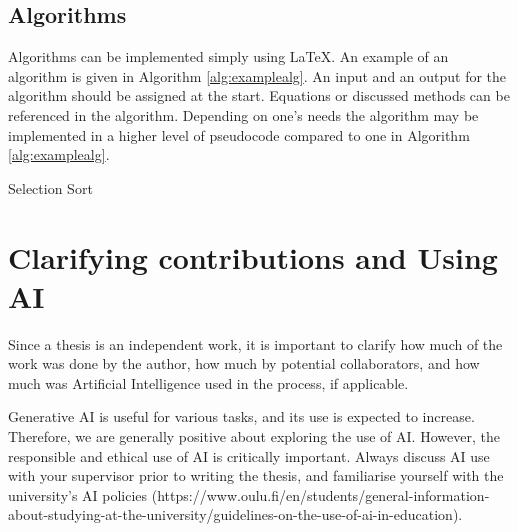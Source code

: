\subsection{Algorithms}
Algorithms can be implemented simply using \LaTeX. An example of an algorithm is given in Algorithm \ref{alg:examplealg}. An input and an output for the algorithm should be assigned at the start. Equations or discussed methods can be referenced in the algorithm. Depending on one's needs the algorithm may be implemented in a higher level of pseudocode compared to one in Algorithm \ref{alg:examplealg}.

\vspace{7mm}
\begin{algorithm}[H]
\SetAlgoLined
\DontPrintSemicolon
{}
\caption{Selection Sort}
\label{alg:examplealg}
\end{algorithm}

\section{Clarifying contributions and Using AI}
\label{AI}
Since a thesis is an independent work, it is important to clarify how much of the work was done by the author, how much by potential collaborators, and how much was Artificial Intelligence used in the process, if applicable. 

Generative AI is useful for various tasks, and its use is expected to increase. Therefore, we are generally positive about exploring the use of AI. However, the responsible and ethical use of AI is critically important. Always discuss AI use with your supervisor prior to writing the thesis, and familiarise yourself with the university's AI policies (https://www.oulu.fi/en/students/general-information-about-studying-at-the-university/guidelines-on-the-use-of-ai-in-education).

